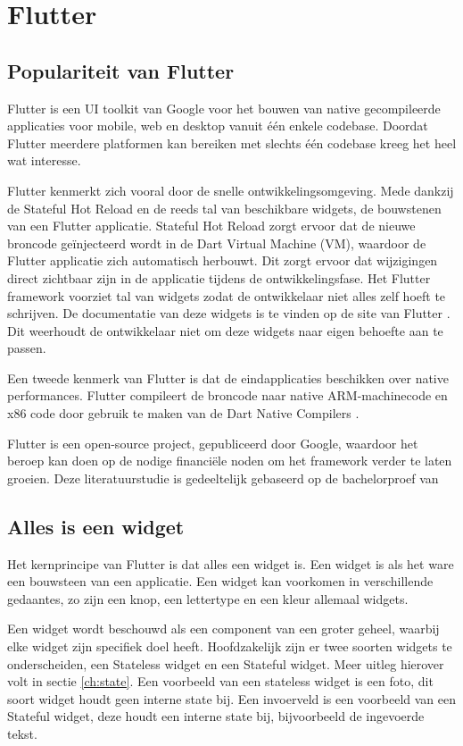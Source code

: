 \section{Flutter}
\subsection{Populariteit van Flutter}
Flutter is een UI toolkit van Google voor het bouwen van native gecompileerde applicaties voor mobile, web en desktop vanuit één enkele codebase. Doordat Flutter meerdere platformen kan bereiken met slechts één codebase kreeg het heel wat interesse. 

Flutter kenmerkt zich vooral door de snelle ontwikkelingsomgeving. Mede dankzij de Stateful Hot Reload en de reeds tal van beschikbare widgets, de bouwstenen van een Flutter applicatie. Stateful Hot Reload zorgt ervoor dat de nieuwe broncode geïnjecteerd wordt in de Dart Virtual Machine (VM), waardoor de Flutter applicatie zich automatisch herbouwt. Dit zorgt ervoor dat wijzigingen direct zichtbaar zijn in de applicatie tijdens de ontwikkelingsfase. Het Flutter framework voorziet tal van widgets zodat de ontwikkelaar niet alles zelf hoeft te schrijven. De documentatie van deze widgets is te vinden op de site van Flutter \autocite{Flutter2019}. Dit weerhoudt de ontwikkelaar niet om deze widgets naar eigen behoefte aan te passen.

Een tweede kenmerk van Flutter is dat de eindapplicaties beschikken over native performances. Flutter compileert de broncode naar native ARM-machinecode en x86 code door gebruik te maken van de Dart Native Compilers \autocite{Dart2019}.

Flutter is een open-source project, gepubliceerd door Google, waardoor het beroep kan doen op de nodige financiële noden om het framework verder te laten groeien. 
Deze literatuurstudie is gedeeltelijk gebaseerd op de bachelorproef van \autocite{DeConinck2019}

\subsection{Alles is een widget}
\label{ch:alles-is-een-widget}
Het kernprincipe van Flutter is dat alles een widget is. Een widget is als het ware een bouwsteen van een applicatie. Een widget kan voorkomen in verschillende gedaantes, zo zijn een knop, een lettertype en een kleur allemaal widgets. 

Een widget wordt beschouwd als een component van een groter geheel, waarbij elke widget zijn specifiek doel heeft.
Hoofdzakelijk zijn er twee soorten widgets te onderscheiden, een Stateless widget en een Stateful widget. Meer uitleg hierover volt in sectie \ref{ch:state}. Een voorbeeld van een stateless widget is een foto, dit soort widget houdt geen interne state bij. Een invoerveld is een voorbeeld van een Stateful widget, deze houdt een interne state bij, bijvoorbeeld de ingevoerde tekst. 
\newline

